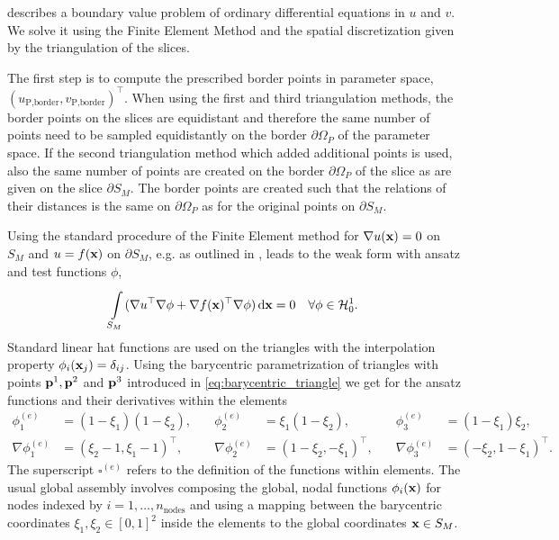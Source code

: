  describes a boundary value problem of ordinary differential equations in $u$ and $v$. We solve it using the Finite Element Method and the spatial discretization given by the triangulation of the slices.

The first step is to compute the prescribed border points in parameter space,\\
 ${(u_\text{P,border}, v_\text{P,border})^\top}$. When using the first and third triangulation methods, the border points on the slices are  equidistant and therefore the same number of points need to be sampled equidistantly on the border $∂\Omega_P$ of the parameter space.
If the second triangulation method which added additional points is used, also the same number of points  are created on the border $∂\Omega_P$ of the slice as are given on the slice $∂S_M$. The border points are created such that the relations of their distances is the same on $∂\Omega_P$ as for the original points on $∂S_M$.

Using the standard procedure of the Finite Element method for $\nabla u(\textbf{x}) = 0$ on $S_M$ and $u=f(\textbf{x})$ on $∂S_M$, e.g. as outlined in \cite{Remacle2010}, leads to the weak form with ansatz and test functions $\phi$,
\begin{align}\label{eq:est_fe_w}
    \i{S_M}{} (\nabla u^\top \nabla \phi + \nabla f(\bfx)^\top \nabla \phi) \,\d \bfx = 0 \quad \forall \phi \in \mathcal{H}_0^1.
\end{align}
Standard linear hat functions are used on the triangles with the interpolation property $\phi_i(\textbf{x}_j) = \delta_{ij}$. Using the barycentric parametrization of triangles with points $\textbf{p}^1,\textbf{p}^2$ and $\textbf{p}^3$ introduced in \cref{eq:barycentric_triangle} we get for the ansatz functions and their derivatives within the elements
%
\begin{align*}
  \phi^{(e)}_1 &= (1 - \xi_1)(1 - \xi_2), \quad&
  \phi^{(e)}_2 &= \xi_1 (1 - \xi_2), \quad &
  \phi^{(e)}_3 &= (1 - \xi_1) \xi_2,\\[4mm]
  \nabla \phi^{(e)}_1 &= (\xi_2-1, \xi_1 - 1)^\top, \quad&
  \nabla \phi^{(e)}_2 &= (1-\xi_2, -\xi_1)^\top, \quad&
  \nabla \phi^{(e)}_3 &= (-\xi_2, 1-\xi_1)^\top.
\end{align*}
The superscript $\square^{(e)}$ refers to the definition of the functions within elements. The usual global assembly involves composing the global, nodal functions $\phi_i(\textbf{x})$ for nodes indexed by $i=1, \dots, n_\text{nodes}$ and using a mapping between the barycentric coordinates $\xi_1,\xi_2 \in [0,1]^2$ inside the elements to the global coordinates $\textbf{x} \in S_M$.

